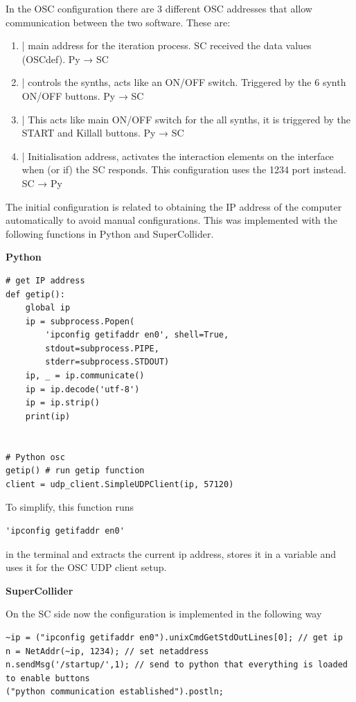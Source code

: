 \documentclass[11pt]{article}
\begin{document}
In the OSC configuration there are 3 different OSC addresses that allow communication between the two software.  These are:
\begin{enumerate}
\item \label{org0e3975e} | main address for the iteration process.  SC received the data values (OSCdef).  Py → SC
\item \label{org0bf8618} | controls the synths, acts like an ON/OFF switch.  Triggered by the 6 synth ON/OFF buttons. Py → SC
\item \label{orga976851} | This acts like main ON/OFF switch for the all synths, it is triggered by the START and Killall buttons. Py → SC
\item \label{orgd1b4dc7} | Initialisation address, activates the interaction elements on the interface when (or if) the SC responds.  This configuration uses the 1234 port instead. SC → Py
\end{enumerate}

The initial configuration is related to obtaining the IP address of the computer automatically to avoid manual configurations.  This was implemented with the following functions in Python and SuperCollider.

\textbf{Python}

\begin{verbatim}
# get IP address
def getip():
    global ip
    ip = subprocess.Popen(
        'ipconfig getifaddr en0', shell=True,
        stdout=subprocess.PIPE,
        stderr=subprocess.STDOUT)
    ip, _ = ip.communicate()
    ip = ip.decode('utf-8')
    ip = ip.strip()
    print(ip)


# Python osc
getip() # run getip function
client = udp_client.SimpleUDPClient(ip, 57120)
\end{verbatim}

To simplify, this function runs
\begin{verbatim}
'ipconfig getifaddr en0'
\end{verbatim}
in the terminal and extracts the current ip address, stores it in a variable and uses it for the OSC UDP client setup.

\textbf{SuperCollider}

On the SC side now the configuration is implemented in the following way
\begin{verbatim}
~ip = ("ipconfig getifaddr en0").unixCmdGetStdOutLines[0]; // get ip
n = NetAddr(~ip, 1234); // set netaddress
n.sendMsg('/startup/',1); // send to python that everything is loaded to enable buttons
("python communication established").postln;
\end{verbatim}
\end{document}
